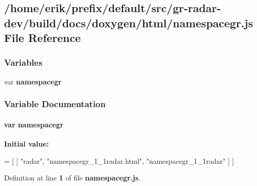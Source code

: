 \subsection{/home/erik/prefix/default/src/gr-\/radar-\/dev/build/docs/doxygen/html/namespacegr.js File Reference}
\label{namespacegr_8js}
\subsubsection*{Variables}
\begin{DoxyCompactItemize}
\item 
var {\bf namespacegr}
\end{DoxyCompactItemize}


\subsubsection{Variable Documentation}
\paragraph[{namespacegr}]{\setlength{\rightskip}{0pt plus 5cm}var namespacegr}\label{namespacegr_8js_afd9b2d9fdc7e0b8d31ab7a50e8b012b4}
{\bfseries Initial value\+:}
\begin{DoxyCode}
=
[
    [ \textcolor{stringliteral}{"radar"}, \textcolor{stringliteral}{"namespacegr\_1\_1radar.html"}, \textcolor{stringliteral}{"namespacegr\_1\_1radar"} ]
]
\end{DoxyCode}


Definition at line {\bf 1} of file {\bf namespacegr.\+js}.

